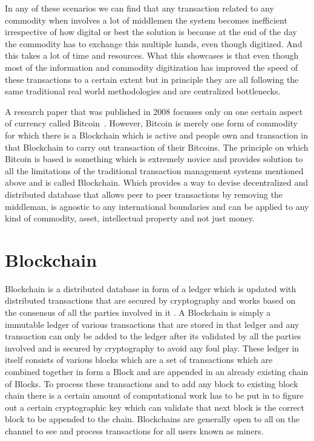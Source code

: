 In any of these scenarios we can find that any transaction related to
any commodity when involves a lot of middlemen the system becomes
inefficient irrespective of how digital or best the solution is
because at the end of the day the commodity has to exchange this
multiple hands, even though digitized. And this takes a lot of time
and resources. What this showcases is that even though most of the
information and commodity digitization has improved the speed of these
transactions to a certain extent but in principle they are all
following the same traditional real world methodologies and are
centralized bottlenecks.

A research paper that was published in 2008 focusses only on one
certain aspect of currency called Bitcoin~\cite{bitcoin12}. However,
Bitcoin is merely one form of commodity for which there is a Blockchain
which is active and people own and transaction in that Blockchain to
carry out transaction of their Bitcoins. The principle on which
Bitcoin is based is something which is extremely novice and provides
solution to all the limitations of the traditional transaction
management systems mentioned above and is called Blockchain. Which
provides a way to devise decentralized and distributed database that
allows peer to peer transactions by removing the middleman, is
agnostic to any international boundaries and can be applied to any
kind of commodity, asset, intellectual property and not just money.


\section{Blockchain}

Blockchain is a distributed database in form of a ledger which is
updated with distributed transactions that are secured by cryptography
and works based on the consensus of all the parties involved in it
\cite{beck13}. A Blockchain is simply a immutable ledger of various
transactions that are stored in that ledger and any transaction can
only be added to the ledger after its validated by all the parties
involved and is secured by cryptography to avoid any foul play. These
ledger in itself consists of various blocks which are a set of
transactions which are combined together in form a Block and are
appended in an already existing chain of Blocks. To process these
transactions and to add any block to existing block chain there is a
certain amount of computational work has to be put in to figure out a
certain cryptographic key which can validate that next block is the
correct block to be appended to the chain. Blockchains are generally
open to all on the channel to see and process transactions for all
users known as miners.

